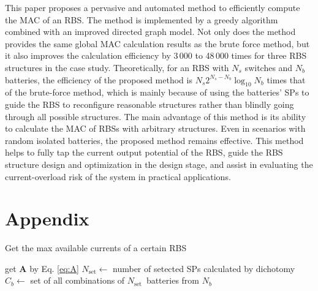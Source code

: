 \documentclass{article}
\begin{document}
This paper proposes a pervasive and automated method to efficiently compute the MAC of an RBS.
The method is implemented by a greedy algorithm combined with an improved directed graph model.
Not only does the method provides the same global MAC calculation results as the brute force method, but it also improves the calculation efficiency by 3\,000 to 48\,000 times for three RBS structures in the case study.
Theoretically, for an RBS with $N_s$ switches and $N_b$ batteries, the efficiency of the proposed method is $N_s 2^{N_s - N_b} \log_{10} N_b$ times that of the brute-force method, which is mainly because of using the batteries' SPs to guide the RBS to reconfigure reasonable structures rather than blindly going through all possible structures.
The main advantage of this method is its ability to calculate the MAC of RBSs with arbitrary structures.
Even in scenarios with random isolated batteries, the proposed method remains effective.
This method helps to fully tap the current output potential of the RBS, guide the RBS structure design and optimization in the design stage, and assist in evaluating the current-overload risk of the system in practical applications.


\section{Appendix} 

\begin{algorithm}
    \caption{Get the max available currents of a certain RBS}\label{alg:greedy}
    \KwResult{$\max \eta$}
    get $\bm{A}$ by Eq. \ref{eq:A}\;
    {
        $N_{\text{set}} \leftarrow$ number of setected SPs calculated by dichotomy\;
        $C_b    \leftarrow$ set of all combinations of $N_{\text{set}} $~batteries from $N_b$\;
    }
\end{algorithm}
\end{document}

